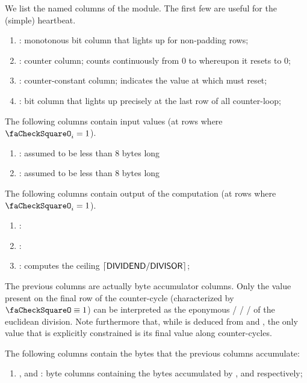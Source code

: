 We list the named columns of the \eucMod{} module. The first few are useful for the (simple) heartbeat.
\begin{enumerate}
    \item \iomf:
	monotonous bit column that lights up for non-padding rows;
    \item \ct:
	counter column; 
	counts continuously from 0 to \maxCt whereupon it resets to 0;
    \item \maxCt:
	counter-constant column;
	indicates the value at which \ct must reset;
    \item \done:
	bit column that lights up precisely at the last row of all counter-loop;
\end{enumerate}
The following columns contain input values (at rows where $\done_{i}=1$).
\begin{enumerate}[resume]
    \item \dividend:
	assumed to be less than 8 bytes long
    \item \divisor:
	assumed to be less than 8 bytes long
\end{enumerate}
The following columns contain output of the computation (at rows where $\done_{i}=1$).
\begin{enumerate}[resume]
    \item \quotient:
    \item \remainder:
    \item \ceiling:
	computes the ceiling $\left\lceil \textsf{DIVIDEND} / \textsf{DIVISOR} \right \rceil$;
\end{enumerate}
\saNote{} The previous columns are actually byte accumulator columns.
Only the value present on the final row of the counter-cycle (characterized by $\done \equiv 1$) can be interpreted as the eponymous \dividend{} / \divisor{} / \quotient{} / \remainder{} of the euclidean division.
Note furthermore that, while \ceiling{} is deduced from \quotient{} and \remainder{}, the only value that is explicitly constrained is its final value along counter-cycles.

\noindent The following columns contain the bytes that the previous columns accumulate:
\begin{enumerate}[resume]
    \item
	\divisorByte,
	\quotientByte{} and
	\remainderByte:
	byte columns containing the bytes accumulated by
	\divisor,
	\quotient{} and
	\remainder respectively;
\end{enumerate}
